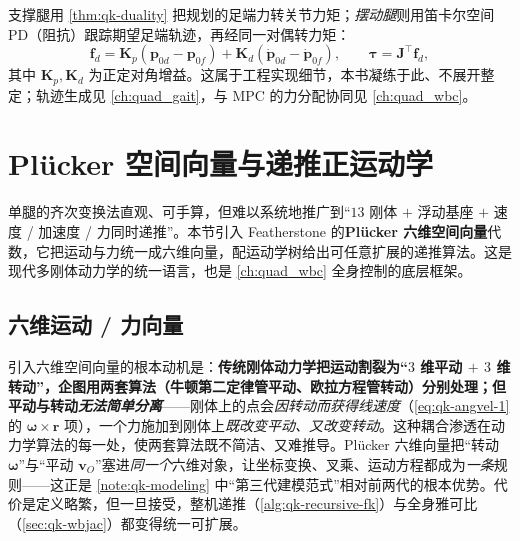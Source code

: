 \begin{practice}\label{prac:qk-swing}
支撑腿用 \cref{thm:qk-duality} 把规划的足端力转关节力矩；\emph{摆动腿}则用笛卡尔空间 PD（阻抗）跟踪期望足端轨迹，再经同一对偶转力矩\cite{unitree2023quadruped}：
\[
  \mathbf{f}_d=\mathbf{K}_p(\boldsymbol{p}_{0d}-\boldsymbol{p}_{0f})+\mathbf{K}_d(\dot{\boldsymbol{p}}_{0d}-\dot{\boldsymbol{p}}_{0f}),
  \qquad \boldsymbol{\tau}=\mathbf{J}^\top\mathbf{f}_d,
\]
其中 $\mathbf{K}_p,\mathbf{K}_d$ 为正定对角增益。这属于工程实现细节，本书凝练于此、不展开整定；轨迹生成见 \cref{ch:quad_gait}，与 MPC 的力分配协同见 \cref{ch:quad_wbc}。
\end{practice}

\section{Plücker 空间向量与递推正运动学}
\label{sec:qk-plucker}

单腿的齐次变换法直观、可手算，但难以系统地推广到“$13$ 刚体 $+$ 浮动基座 $+$ 速度 / 加速度 / 力同时递推”。本节引入 Featherstone 的\textbf{Plücker 六维空间向量}代数\cite{yu2021quadruped,featherstone2008rigid}，它把运动与力统一成六维向量，配运动学树给出可任意扩展的递推算法。这是现代多刚体动力学的统一语言，也是 \cref{ch:quad_wbc} 全身控制的底层框架。

\subsection{六维运动 / 力向量}
\label{subsec:qk-spatial-vec}

\begin{insight}\label{ins:qk-why-spatial}
引入六维空间向量的根本动机是：\textbf{传统刚体动力学把运动割裂为“$3$ 维平动 $+$ $3$ 维转动”，企图用两套算法（牛顿第二定律管平动、欧拉方程管转动）分别处理；但平动与转动\emph{无法简单分离}}\cite{yu2021quadruped}——刚体上的点会\emph{因转动而获得线速度}（\cref{eq:qk-angvel-1} 的 $\boldsymbol{\omega}\times\boldsymbol{r}$ 项），一个力施加到刚体上\emph{既改变平动、又改变转动}。这种耦合渗透在动力学算法的每一处，使两套算法既不简洁、又难推导。Plücker 六维向量把“转动 $\boldsymbol{\omega}$”与“平动 $\boldsymbol{v}_O$”塞进\emph{同一个}六维对象，让坐标变换、叉乘、运动方程都成为\emph{一条}规则——这正是 \cref{note:qk-modeling} 中“第三代建模范式”相对前两代的根本优势。代价是定义略繁，但一旦接受，整机递推（\cref{alg:qk-recursive-fk}）与全身雅可比（\cref{sec:qk-wbjac}）都变得统一可扩展。
\end{insight}


